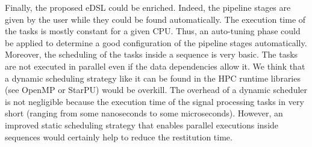 Finally, the proposed eDSL could be enriched. Indeed, the pipeline stages are
given by the user while they could be found automatically. The execution time of
the tasks is mostly constant for a given CPU. Thus, an auto-tuning phase could
be applied to determine a good configuration of the pipeline stages
automatically. Moreover, the scheduling of the tasks inside a sequence is very
basic. The tasks are not executed in parallel even if the data dependencies
allow it. We think that a dynamic scheduling strategy like it can be found in
the HPC runtime libraries (see OpenMP or StarPU) would be overkill. The overhead
of a dynamic scheduler is not negligible because the execution time of the
signal processing tasks in very short (ranging from some nanoseconds to some
microseconds). However, an improved static scheduling strategy that enables
parallel executions inside sequences would certainly help to reduce the
restitution time.


